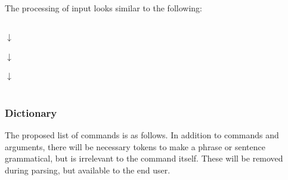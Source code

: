 \documentclass[letterpaper, twoside, 12pt]{memoir}
\begin{document}
The processing of input looks similar to the following:

\begin{center}
   \\
  \vspace{\fill}
  {\large $\downarrow$} \\
  \vspace{\fill}
   \\
  \vspace{\fill}
  {\large $\downarrow$} \\
  \vspace{\fill}
   \\
  \vspace{\fill}
  {\large $\downarrow$} \\
  \vspace{\fill}
   \\
\end{center}

\subsubsection{Dictionary}
The proposed list of commands is as follows. In addition to commands and arguments, there will be necessary tokens to make a phrase or sentence grammatical, but is irrelevant to the command itself. These will be removed during parsing, but available to the end user.
\end{document}
